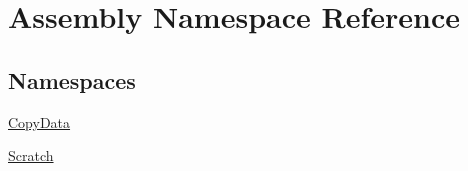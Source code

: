 \hypertarget{namespace_assembly}{}\section{Assembly Namespace Reference}
\label{namespace_assembly}
\subsection*{Namespaces}
\begin{DoxyCompactItemize}
\item 
 \hyperlink{namespace_assembly_1_1_copy_data}{Copy\+Data}
\item 
 \hyperlink{namespace_assembly_1_1_scratch}{Scratch}
\end{DoxyCompactItemize}
